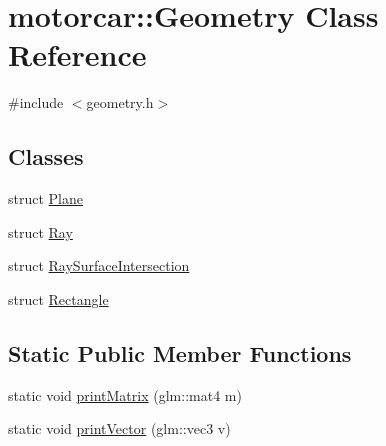 \hypertarget{classmotorcar_1_1Geometry}{\section{motorcar\-:\-:Geometry Class Reference}
\label{classmotorcar_1_1Geometry}
}


{\ttfamily \#include $<$geometry.\-h$>$}

\subsection*{Classes}
\begin{DoxyCompactItemize}
\item 
struct \hyperlink{structmotorcar_1_1Geometry_1_1Plane}{Plane}
\item 
struct \hyperlink{structmotorcar_1_1Geometry_1_1Ray}{Ray}
\item 
struct \hyperlink{structmotorcar_1_1Geometry_1_1RaySurfaceIntersection}{Ray\-Surface\-Intersection}
\item 
struct \hyperlink{structmotorcar_1_1Geometry_1_1Rectangle}{Rectangle}
\end{DoxyCompactItemize}
\subsection*{Static Public Member Functions}
\begin{DoxyCompactItemize}
\item 
static void \hyperlink{classmotorcar_1_1Geometry_a35ee70e5dab9981b9f1914eca9580b06}{print\-Matrix} (glm\-::mat4 m)
\item 
static void \hyperlink{classmotorcar_1_1Geometry_a97660333acd464a86c5ab7f5672fb3d2}{print\-Vector} (glm\-::vec3 v)
\end{DoxyCompactItemize}


